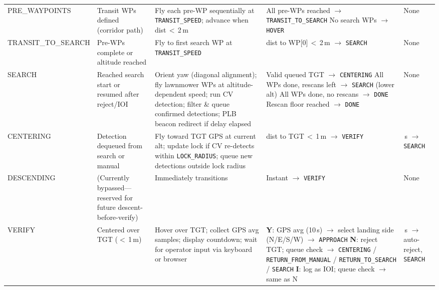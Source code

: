 \begin{small}
\begin{longtable}{
  @{}
  >{\ttfamily\raggedright}p{2.6cm}
  p{3.0cm}
  p{3.2cm}
  p{3.8cm}
  >{\raggedright\arraybackslash}p{2.2cm}
  @{}
}
\addlinespace
\midrule
\addlinespace

PRE\_WAYPOINTS &
  Transit WPs defined (corridor path) &
  Fly each pre-WP sequentially at \texttt{TRANSIT\_SPEED}; advance when dist\,$<$\,2\,m &
  All pre-WPs reached $\to$ \texttt{TRANSIT\_TO\_SEARCH} \newline
  No search WPs $\to$ \texttt{HOVER} &
  None \\
\addlinespace

TRANSIT\_TO\_SEARCH &
  Pre-WPs complete or altitude reached &
  Fly to first search WP at \texttt{TRANSIT\_SPEED} &
  dist to WP[0]\,$<$\,2\,m $\to$ \texttt{SEARCH} &
  None \\
\addlinespace

SEARCH &
  Reached search start or resumed after reject/IOI &
  Orient yaw (diagonal alignment); fly lawnmower WPs at altitude-dependent speed; run CV detection; filter \& queue confirmed detections; PLB beacon redirect if delay elapsed &
  Valid queued TGT $\to$ \texttt{CENTERING} \newline
  All WPs done, rescans left $\to$ \texttt{SEARCH} (lower alt) \newline
  All WPs done, no rescans $\to$ \texttt{DONE} \newline
  Rescan floor reached $\to$ \texttt{DONE} &
  None \\

\addlinespace
\midrule
\addlinespace

CENTERING &
  Detection dequeued from search or manual &
  Fly toward TGT GPS at current alt; update lock if CV re-detects within \texttt{LOCK\_RADIUS}; queue new detections outside lock radius &
  dist to TGT\,$<$\,1\,m $\to$ \texttt{VERIFY} &
  60\,s $\to$ \texttt{SEARCH} \\
\addlinespace

DESCENDING &
  (Currently bypassed---reserved for future descent-before-verify) &
  Immediately transitions &
  Instant $\to$ \texttt{VERIFY} &
  None \\
\addlinespace

VERIFY &
  Centered over TGT ($<$\,1\,m) &
  Hover over TGT; collect GPS avg samples; display countdown; wait for operator input via keyboard or browser &
  \textbf{Y}: GPS avg (10\,s) $\to$ select landing side (N/E/S/W) $\to$ \texttt{APPROACH} \newline
  \textbf{N}: reject TGT; queue check $\to$ \texttt{CENTERING} / \texttt{RETURN\_FROM\_MANUAL} / \texttt{RETURN\_TO\_SEARCH} / \texttt{SEARCH} \newline
  \textbf{I}: log as IOI; queue check $\to$ same as N &
  120\,s $\to$ auto-reject, \texttt{SEARCH} \\


\end{longtable}
\end{small}
